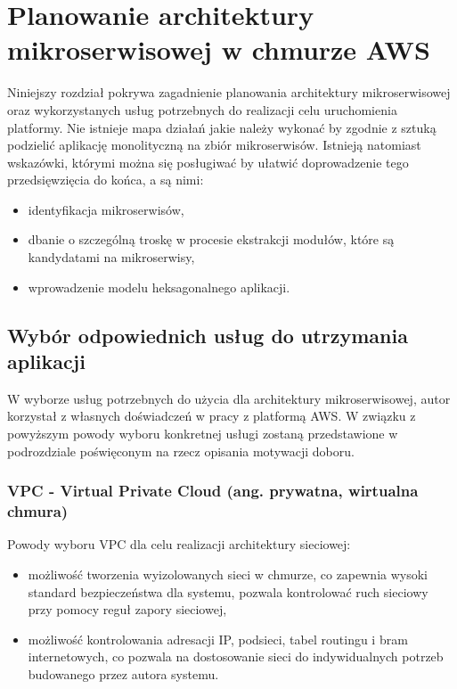 \documentclass[12pt,twoside]{book}
\begin{document}
\chapter{Planowanie architektury mikroserwisowej w chmurze AWS}
Niniejszy rozdział pokrywa zagadnienie planowania architektury mikroserwisowej oraz wykorzystanych usług potrzebnych do realizacji celu uruchomienia platformy. Nie istnieje mapa działań jakie należy wykonać by zgodnie z sztuką podzielić aplikację monolityczną na zbiór mikroserwisów. Istnieją natomiast wskazówki, którymi można się posługiwać by ułatwić doprowadzenie tego przedsięwzięcia do końca, a są nimi:

\begin{itemize}
\item identyfikacja mikroserwisów,
\item dbanie o szczególną troskę w procesie ekstrakcji modułów, które są kandydatami na mikroserwisy,
\item wprowadzenie modelu heksagonalnego aplikacji. \cite{java.ee.8.design.patterns}
\end{itemize}

\section{Wybór odpowiednich usług do utrzymania aplikacji}
W wyborze usług potrzebnych do użycia dla architektury mikroserwisowej, autor korzystał z własnych doświadczeń w pracy z platformą AWS. W związku z powyższym powody wyboru konkretnej usługi zostaną przedstawione w podrozdziale poświęconym na rzecz opisania motywacji doboru.

\subsection{VPC - Virtual Private Cloud (ang. prywatna, wirtualna chmura)}
Powody wyboru VPC dla celu realizacji architektury sieciowej:

\begin{itemize}
\item możliwość tworzenia wyizolowanych sieci w chmurze, co zapewnia wysoki standard bezpieczeństwa dla systemu, pozwala kontrolować ruch sieciowy przy pomocy reguł zapory sieciowej,
\item możliwość kontrolowania adresacji IP, podsieci, tabel routingu i bram internetowych, co pozwala na dostosowanie sieci do indywidualnych potrzeb budowanego przez autora systemu. \cite{aws.vpc}
\end{itemize}
\end{document}
